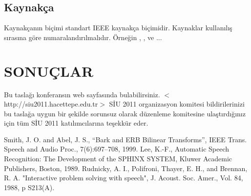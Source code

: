 \documentclass{article}
\begin{document}
\subsection{ Kaynakça}

Kaynakçanın biçimi standart IEEE kaynakça biçimidir. Kaynaklar
kullanılış sırasına göre numaralandırılmalıdır. Örneğin
\cite{ES1}, \cite{ES2}, ve \cite{ES3}...


\section{SONUÇLAR}

Bu taslağı konferansın web sayfasında bulabilirsiniz. $<$http://siu2011.hacettepe.edu.tr$>$
SİU 2011 organizasyon komitesi bildirilerinizi bu taslağa
uygun bir şekilde sorunsuz olarak düzenleme komitesine
ulaştırdığınız için tüm SİU 2011 katılımcılarına teşekkür eder.



\begin{kaynaklar}{10}
 Smith, J. O. and Abel, J. S.,
``Bark and {ERB} Bilinear Transforms'', IEEE Trans. Speech and
Audio Proc., 7(6):697--708, 1999.
 Lee, K.-F., Automatic Speech Recognition:
The Development of the SPHINX SYSTEM, Kluwer Academic Publishers,
Boston, 1989.
 Rudnicky, A. I., Polifroni, Thayer, E. H.,
 and Brennan, R. A.
"Interactive problem solving with speech", J. Acoust. Soc. Amer.,
Vol. 84, 1988, p S213(A).
\end{kaynaklar}
\end{document}
